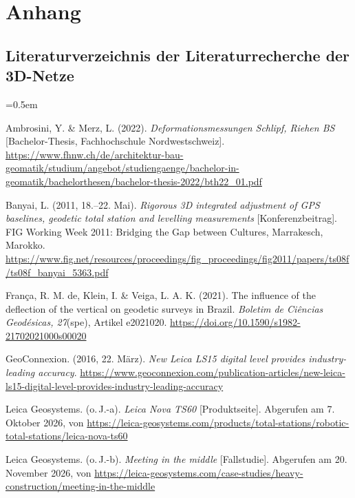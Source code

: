\section{Anhang}
\label{sec:anhang}

\subsection{Literaturverzeichnis der Literaturrecherche der 3D-Netze}
\label{Literaturverzeichnis der Literaturrecherche}

\begin{list}{}{\leftmargin=1.27cm \itemindent=-1.27cm \itemsep=0.5em}

\item Ambrosini, Y. \& Merz, L. (2022). \textit{Deformationsmessungen Schlipf, Riehen BS} [Bachelor-Thesis, Fachhochschule Nordwestschweiz]. \url{https://www.fhnw.ch/de/architektur-bau-geomatik/studium/angebot/studiengaenge/bachelor-in-geomatik/bachelorthesen/bachelor-thesis-2022/bth22_01.pdf}

\item Banyai, L. (2011, 18.--22. Mai). \textit{Rigorous 3D integrated adjustment of GPS baselines, geodetic total station and levelling measurements} [Konferenzbeitrag]. FIG Working Week 2011: Bridging the Gap between Cultures, Marrakesch, Marokko. \url{https://www.fig.net/resources/proceedings/fig_proceedings/fig2011/papers/ts08f/ts08f_banyai_5363.pdf}

\item França, R. M. de, Klein, I. \& Veiga, L. A. K. (2021). The influence of the deflection of the vertical on geodetic surveys in Brazil. \textit{Boletim de Ciências Geodésicas, 27}(spe), Artikel e2021020. \url{https://doi.org/10.1590/s1982-21702021000s00020}

\item GeoConnexion. (2016, 22. März). \textit{New Leica LS15 digital level provides industry-leading accuracy}. \url{https://www.geoconnexion.com/publication-articles/new-leica-ls15-digital-level-provides-industry-leading-accuracy}

\item Leica Geosystems. (o.\,J.-a). \textit{Leica Nova TS60} [Produktseite]. Abgerufen am 7. Oktober 2026, von \url{https://leica-geosystems.com/products/total-stations/robotic-total-stations/leica-nova-ts60}

\item Leica Geosystems. (o.\,J.-b). \textit{Meeting in the middle} [Fallstudie]. Abgerufen am 20. November 2026, von \url{https://leica-geosystems.com/case-studies/heavy-construction/meeting-in-the-middle}


\end{list}
